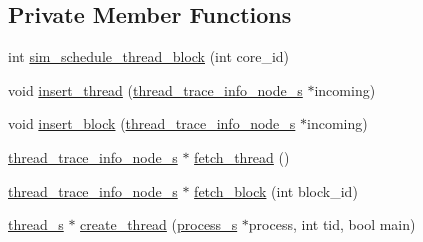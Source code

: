 \subsection*{Private Member Functions}
\begin{DoxyCompactItemize}
\item 
int \hyperlink{classprocess__manager__c_af5b771accff1a1a586eda0fff5d731c4}{sim\_\-schedule\_\-thread\_\-block} (int core\_\-id)
\item 
void \hyperlink{classprocess__manager__c_aac295c0fb13eee3ac88eb194f6490d38}{insert\_\-thread} (\hyperlink{structthread__trace__info__node__s}{thread\_\-trace\_\-info\_\-node\_\-s} $\ast$incoming)
\item 
void \hyperlink{classprocess__manager__c_a5fa5c35eb19fd242cd6f6f10ff5e5d59}{insert\_\-block} (\hyperlink{structthread__trace__info__node__s}{thread\_\-trace\_\-info\_\-node\_\-s} $\ast$incoming)
\item 
\hyperlink{structthread__trace__info__node__s}{thread\_\-trace\_\-info\_\-node\_\-s} $\ast$ \hyperlink{classprocess__manager__c_ade9cab5331bac2126425b1152d3e7163}{fetch\_\-thread} ()
\item 
\hyperlink{structthread__trace__info__node__s}{thread\_\-trace\_\-info\_\-node\_\-s} $\ast$ \hyperlink{classprocess__manager__c_a7c24e875698b8dd7da47597a5b2fb2aa}{fetch\_\-block} (int block\_\-id)
\item 
\hyperlink{structthread__s}{thread\_\-s} $\ast$ \hyperlink{classprocess__manager__c_ab37b9bf4f76080b5a6adb5e902a761ef}{create\_\-thread} (\hyperlink{structprocess__s}{process\_\-s} $\ast$process, int tid, bool main)
\end{DoxyCompactItemize}
